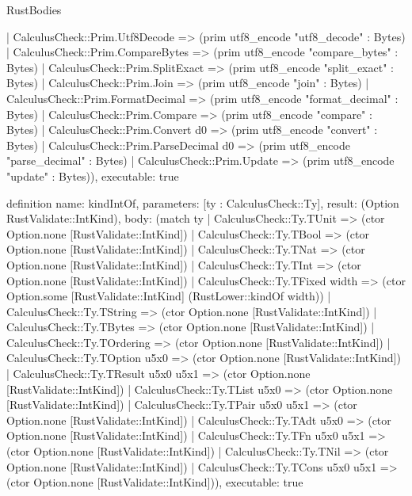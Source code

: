 \begin{lexlean}{RustBodies}
\begin{semanticmodule}
{    | CalculusCheck::Prim.Utf8Decode => (prim utf8_encode "utf8_decode" : Bytes)
    | CalculusCheck::Prim.CompareBytes => (prim utf8_encode "compare_bytes" : Bytes)
    | CalculusCheck::Prim.SplitExact => (prim utf8_encode "split_exact" : Bytes)
    | CalculusCheck::Prim.Join => (prim utf8_encode "join" : Bytes)
    | CalculusCheck::Prim.FormatDecimal => (prim utf8_encode "format_decimal" : Bytes)
    | CalculusCheck::Prim.Compare => (prim utf8_encode "compare" : Bytes)
    | CalculusCheck::Prim.Convert d0 => (prim utf8_encode "convert" : Bytes)
    | CalculusCheck::Prim.ParseDecimal d0 => (prim utf8_encode "parse_decimal" : Bytes)
    | CalculusCheck::Prim.Update => (prim utf8_encode "update" : Bytes)),
  executable: true
}

definition{
  name: kindIntOf,
  parameters: [ty : CalculusCheck::Ty],
  result: (Option RustValidate::IntKind),
  body: (match ty
    | CalculusCheck::Ty.TUnit => (ctor Option.none [RustValidate::IntKind])
    | CalculusCheck::Ty.TBool => (ctor Option.none [RustValidate::IntKind])
    | CalculusCheck::Ty.TNat => (ctor Option.none [RustValidate::IntKind])
    | CalculusCheck::Ty.TInt => (ctor Option.none [RustValidate::IntKind])
    | CalculusCheck::Ty.TFixed width => (ctor Option.some [RustValidate::IntKind] (RustLower::kindOf width))
    | CalculusCheck::Ty.TString => (ctor Option.none [RustValidate::IntKind])
    | CalculusCheck::Ty.TBytes => (ctor Option.none [RustValidate::IntKind])
    | CalculusCheck::Ty.TOrdering => (ctor Option.none [RustValidate::IntKind])
    | CalculusCheck::Ty.TOption u5x0 => (ctor Option.none [RustValidate::IntKind])
    | CalculusCheck::Ty.TResult u5x0 u5x1 => (ctor Option.none [RustValidate::IntKind])
    | CalculusCheck::Ty.TList u5x0 => (ctor Option.none [RustValidate::IntKind])
    | CalculusCheck::Ty.TPair u5x0 u5x1 => (ctor Option.none [RustValidate::IntKind])
    | CalculusCheck::Ty.TAdt u5x0 => (ctor Option.none [RustValidate::IntKind])
    | CalculusCheck::Ty.TFn u5x0 u5x1 => (ctor Option.none [RustValidate::IntKind])
    | CalculusCheck::Ty.TNil => (ctor Option.none [RustValidate::IntKind])
    | CalculusCheck::Ty.TCons u5x0 u5x1 => (ctor Option.none [RustValidate::IntKind])),
  executable: true
}


\end{semanticmodule}
\end{lexlean}
